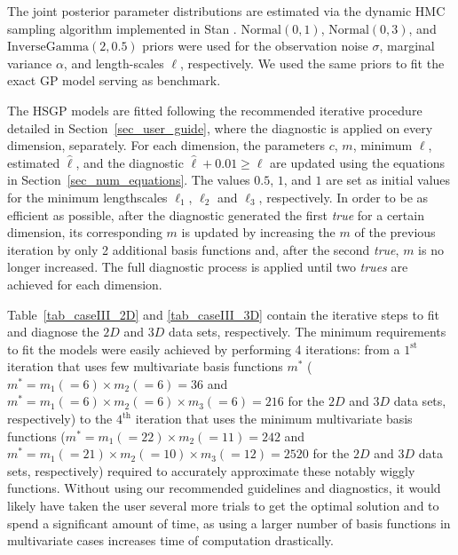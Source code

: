 The joint posterior parameter distributions are estimated via the dynamic HMC sampling algorithm implemented in Stan \citep{StanTeam:2021}. $\mathrm{Normal}(0,1)$, $\mathrm{Normal}(0,3)$, and $\mathrm{InverseGamma}(2,0.5)$ priors were used for the observation noise $\sigma$, marginal variance $\alpha$, and length-scales $\ell$, respectively. We used the same priors to fit the exact GP model serving as benchmark.

The HSGP models are fitted following the recommended iterative procedure detailed in Section~\ref{sec_user_guide}, where the diagnostic is applied on every dimension, separately. For each dimension, the parameters $c$, $m$, minimum $\ell$, estimated $\hat{\ell}$, and the diagnostic $\hat{\ell} + 0.01 \geq \ell$ are updated using the equations in Section~\ref{sec_num_equations}. The values $0.5$, $1$, and $1$ are set as initial values for the minimum lengthscales $\ell_1$, $\ell_2$ and $\ell_3$, respectively. In order to be as efficient as possible, after the diagnostic generated the first \textit{true} for a certain dimension, its corresponding $m$ is updated by increasing the $m$ of the previous iteration by only 2 additional basis functions and, after the second \textit{true}, $m$ is no longer increased. The full diagnostic process is applied until two \textit{trues} are achieved for each dimension. 

Table~\ref{tab_caseIII_2D} and \ref{tab_caseIII_3D} contain the iterative steps to fit and diagnose the $2D$ and $3D$ data sets, respectively. 
The minimum requirements to fit the models were easily achieved by performing 4 iterations: from a $1^{\text{st}}$ iteration that uses few multivariate basis functions $m^*$ ($m^*=m_1(=6) \times m_2(=6)=36$ and $m^*=m_1(=6) \times m_2(=6) \times m_3(=6)=216$ for the $2D$ and $3D$ data sets, respectively) to the $4^{\text{th}}$ iteration that uses the minimum multivariate basis functions ($m^*=m_1(=22) \times m_2(=11)=242$ and $m^*=m_1(=21) \times m_2(=10) \times m_3(=12)=2520$ for the $2D$ and $3D$ data sets, respectively) required to accurately approximate these notably wiggly functions. Without using our recommended guidelines and diagnostics, it would likely have taken the user several more trials to get the optimal solution and to spend a significant amount of time, as using a larger number of basis functions in multivariate cases increases time of computation drastically.

